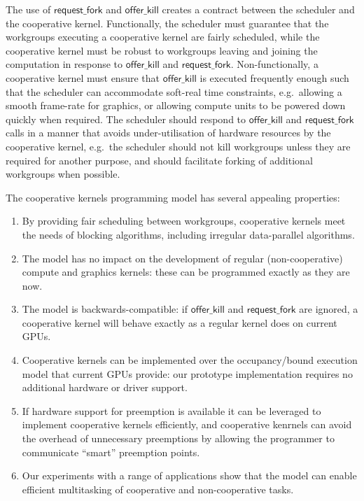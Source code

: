\documentclass[parskip=half,sigconf,review, anonymous=true, acmcopyrightmode=none]{acmart}
\newcommand{\cutthree}[1]{}
\newcommand{\offerfork}{\mathsf{request\_fork}}
\newcommand{\offerkill}{\mathsf{offer\_kill}}
\begin{document}
The use of $\offerfork$ and $\offerkill$ creates a contract between
the scheduler and the cooperative kernel.
Functionally, the
scheduler must guarantee that the workgroups executing a cooperative
kernel are fairly scheduled, while the cooperative kernel must be
robust to workgroups leaving and joining the computation in response
to $\offerkill$ and $\offerfork$.  Non-functionally, a cooperative
kernel must ensure that $\offerkill$ is executed frequently enough
such that the scheduler can accommodate soft-real time constraints,
e.g.\ allowing a smooth frame-rate for graphics, or allowing compute
units to be powered down quickly when required.  The scheduler should
respond to $\offerkill$ and $\offerfork$ calls in a manner that avoids
under-utilisation of hardware resources by the cooperative kernel,
e.g.\ the scheduler should not kill workgroups unless they are
required for another purpose, and should facilitate forking of
additional workgroups when possible.

The cooperative kernels programming model has several appealing
properties:

\begin{enumerate}[leftmargin=*]

\item By providing fair scheduling between workgroups, cooperative
  kernels meet the needs of blocking algorithms, including irregular
  data-parallel algorithms.

\item The model has no impact on the development of regular
  (non-cooperative) compute and graphics kernels: these can be programmed exactly as they
  are now.

\item The model is backwards-compatible: if $\offerkill$ and $\offerfork$ are ignored, a cooperative kernel will behave
  exactly as a regular kernel does on current GPUs.

\item Cooperative kernels can be implemented over the occupancy\-/bound
  execution model that current GPUs provide: our prototype implementation requires
  no additional hardware or driver support.

\item If hardware support for preemption is available it can be leveraged to implement cooperative kernels efficiently, and cooperative kenrnels can avoid the overhead of unnecessary preemptions by allowing the programmer to communicate ``smart'' preemption points.

\item Our experiments with a range of applications \cutthree{using three GPUs} show that the model can enable efficient multitasking of cooperative and non-cooperative
  tasks.

\end{enumerate}
\end{document}
